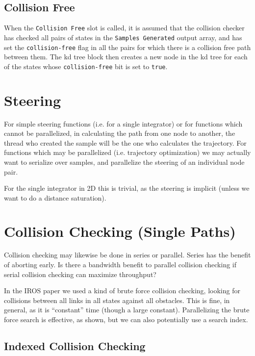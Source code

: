 \subsection{Collision Free}
When the \texttt{Collision Free} slot is called, it is assumed that the collision checker has checked all pairs of states in the \texttt{Samples Generated} output array, and has set the \texttt{collision-free} flag in all the pairs for which there is a collision free path between them. The kd tree block then creates a new node in the kd tree for each of the states whose \texttt{collision-free} bit is set to \texttt{true}.

\section{Steering}

For simple steering functions (i.e. for a single integrator) or for functions which cannot be parallelized, in calculating the path from one node to another, the thread who created the sample will be the one who calculates the trajectory. For functions which may be parallelized (i.e. trajectory optimization) we may actually want to serialize over samples, and parallelize the steering of an individual node pair. 

For the single integrator in 2D this is trivial, as the steering is implicit (unless we want to do a distance saturation).

\section{Collision Checking (Single Paths)}

Collision checking may likewise be done in series or parallel. Series has the benefit of aborting early. Is there a bandwidth benefit to parallel collision checking if serial collision checking can maximize throughput?

In the IROS paper we used a kind of brute force collision checking, looking for collisions between all links in all states against all obstacles. This is fine, in general, as it is ``constant'' time (though a large constant). Parallelizing the brute force search is effective, as shown, but we can also potentially use a search index. 


\subsection{Indexed Collision Checking}

